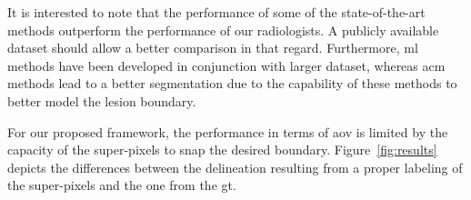 It is interested to note that the performance of some of the state-of-the-art methods outperform the performance of our radiologists. A publicly available dataset should allow a better comparison in that regard. Furthermore, \ac{ml} methods have been developed in conjunction with larger dataset, whereas \ac{acm} methods lead to a better segmentation due to the capability of these methods to better model the lesion boundary.

For our proposed framework, the performance in terms of \ac{aov} is limited by the capacity of the super-pixels to snap the desired boundary. Figure~\ref{fig:results} depicts the differences between the delineation resulting from a proper labeling of the super-pixels and the one from the \ac{gt}.








